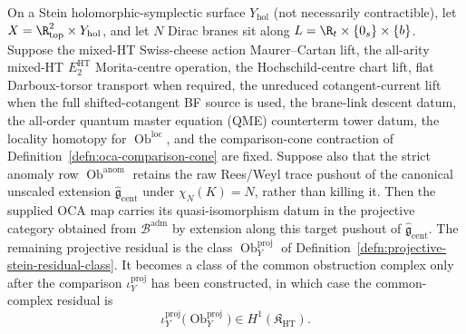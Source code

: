 \begin{thm}
\label{thm:projective-stein-descent-criterion-HS}
On a Stein holomorphic-symplectic surface $Y_{\mathrm{hol}}$
(not necessarily contractible), let
\(X=\R^2_{\mathrm{top}}\times Y_{\mathrm{hol}}\), and let \(N\) Dirac
branes sit along \(L=\R_t\times\{0_s\}\times\{b\}\).  Suppose the mixed-HT
Swiss-cheese action Maurer--Cartan lift, the all-arity mixed-HT
\(E_2^{\mathrm{HT}}\) Morita-centre operation, the Hochschild-centre
chart lift, flat Darboux-torsor
transport when required, the unreduced cotangent-current lift when the
full shifted-cotangent BF source is used, the brane-link descent datum,
the all-order quantum master equation (QME) counterterm tower datum,
the locality homotopy for \(\operatorname{Ob}^{\mathrm{loc}}\), and the
comparison-cone contraction of Definition~\ref{defn:oca-comparison-cone}
are fixed.
Suppose also that the strict anomaly row
\(\operatorname{Ob}^{\mathrm{anom}}\) retains the raw Rees/Weyl trace
pushout of the canonical unscaled extension
\(\widehat{\mathfrak g}_{\mathrm{cent}}\) under \(\chi_N(K)=N\), rather
than killing it.
Then the supplied OCA map carries its quasi-isomorphism datum in the
projective category obtained from \(\mathcal B^{\mathrm{adm}}\) by
extension along this target pushout of
  \(\widehat{\mathfrak g}_{\mathrm{cent}}\).  The remaining projective
  residual is the class
  \(\operatorname{Ob}^{\mathrm{proj}}_Y\) of
  Definition~\ref{defn:projective-stein-residual-class}.  It becomes a
  class of the common obstruction complex only after the comparison
  \(\iota^{\mathrm{proj}}_Y\) has been constructed, in which case the
  common-complex residual is
  \[
    \iota^{\mathrm{proj}}_Y
    \bigl(\operatorname{Ob}^{\mathrm{proj}}_Y\bigr)
    \in H^1(\mathfrak K_{\mathrm{HT}}).
  \]
\end{thm}

